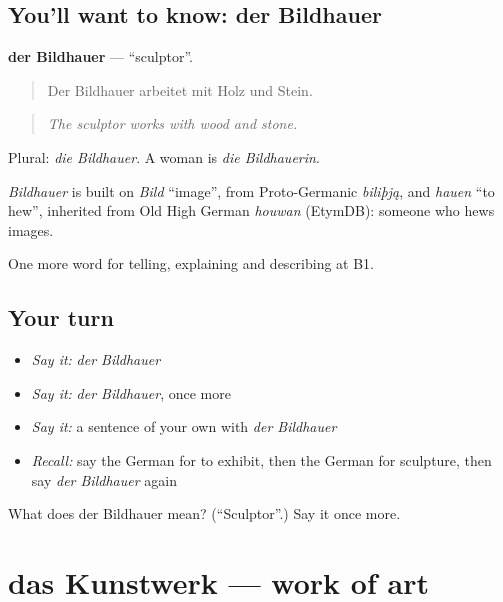\subsection*{You'll want to know: der Bildhauer}
\textbf{der Bildhauer} — \textquotedblleft{}sculptor\textquotedblright{}.

\begin{quote}
Der Bildhauer arbeitet mit Holz und Stein.
\end{quote}

\begin{quote}
\emph{The sculptor works with wood and stone.}
\end{quote}

Plural: \emph{die Bildhauer}. A woman is \emph{die Bildhauerin}.

\begin{cousinweb}
\emph{Bildhauer} is built on \emph{Bild} \textquotedblleft{}image\textquotedblright{}, from Proto-Germanic \emph{biliþją}, and \emph{hauen} \textquotedblleft{}to hew\textquotedblright{}, inherited from Old High German \emph{houwan} (EtymDB): someone who hews images.
\end{cousinweb}

\begin{grammarlens}[title={What you've built}]
One more word for telling, explaining and describing at B1.
\end{grammarlens}

\subsection*{Your turn}
\begin{itemize}
\raggedright
  \item \emph{Say it:} \emph{der Bildhauer}
  \item \emph{Say it:} \emph{der Bildhauer}, once more
  \item \emph{Say it:} a sentence of your own with \emph{der Bildhauer}
  \item \emph{Recall:} say the German for to exhibit, then the German for sculpture, then say \emph{der Bildhauer} again
\end{itemize}

\begin{tcolorbox}[breakable,colback=teal!4,colframe=teal!35!black,title={Before you move on}]
What does der Bildhauer mean? (\textquotedblleft{}Sculptor\textquotedblright{}.) Say it once more.
\end{tcolorbox}
\section[das Kunstwerk]{das Kunstwerk — work of art}

